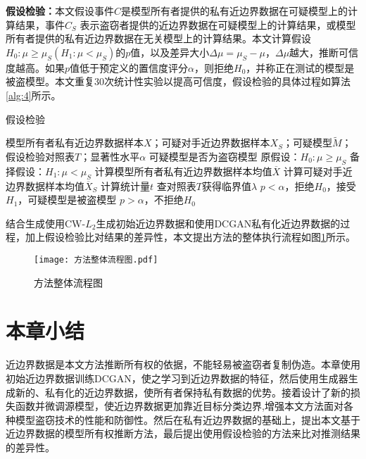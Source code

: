 \noindent\textbf{假设检验：}本文假设事件$C$是模型所有者提供的私有近边界数据在可疑模型上的计算结果，事件$C_S$ 表示盗窃者提供的近边界数据在可疑模型上的计算结果，或模型所有者提供的私有近边界数据在无关模型上的计算结果。本文计算假设$H_0:\mu \geq \mu_S(H_1:\mu < \mu_S)$的$p$值，以及差异大小$\Delta \mu = \mu_S - \mu$，$\Delta\mu$越大，推断可信度越高。如果$p$值低于预定义的置信度评分$\alpha$，则拒绝$H_0$，并称正在测试的模型是被盗模型。本文重复30次统计性实验以提高可信度，假设检验的具体过程如算法\ref{alg:4}所示。

\begin{algorithm}[H] 
	\caption{\small 假设检验}
	\label{alg:4}
	\small
	\begin{algorithmic}[1]
		\Require 模型所有者私有近边界数据样本$X$；可疑对手近边界数据样本$X_S$；可疑模型$\tilde{M}$；假设检验对照表$T$；显著性水平$\alpha$
		\Ensure 可疑模型是否为盗窃模型
		\State 原假设：$H_0:\mu \geq \mu_S$
		\State 备择假设：$H_1:\mu < \mu_S$
		\State 计算模型所有者私有近边界数据样本均值$\overline{X}$                     
		\State 计算可疑对手近边界数据样本均值$\overline{X}_S$ 
		\State 计算统计量$t$
		\State 查对照表$T$获得临界值$\lambda$
		\State $p < \alpha$，拒绝$H_0$，接受$H_1$，可疑模型是被盗模型
		\Else \State $p > \alpha$，不拒绝$H_0$
		\EndIf
	\end{algorithmic}
\end{algorithm}

结合生成使用CW-$L_2$生成初始近边界数据和使用DCGAN私有化近边界数据的过程，加上假设检验比对结果的差异性，本文提出方法的整体执行流程如图\ref{方法整体流程图}所示。

\begin{figure}[htb]%
	\centering
	\setlength{\abovecaptionskip}{5mm} %
	\texttt{[image: 方法整体流程图.pdf]}
	\caption{方法整体流程图}
	\label{方法整体流程图}
	\end {figure}

\section{本章小结}

近边界数据是本文方法推断所有权的依据，不能轻易被盗窃者复制伪造。本章使用初始近边界数据训练DCGAN，使之学习到近边界数据的特征，然后使用生成器生成新的、私有化的近边界数据，使所有者保持私有数据的优势。接着设计了新的损失函数并微调源模型，使近边界数据更加靠近目标分类边界,增强本文方法面对各种模型盗窃技术的性能和防御性。然后在私有近边界数据的基础上，提出本文基于近边界数据的模型所有权推断方法，最后提出使用假设检验的方法来比对推测结果的差异性。